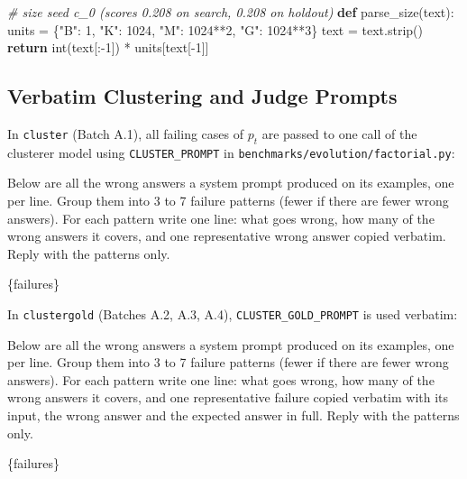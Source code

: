 \documentclass[10pt]{article}
\newenvironment{Shaded}{}{}
\newcommand{\BuiltInTok}[1]{\textcolor[rgb]{0.00,0.50,0.00}{#1}}
\newcommand{\CommentTok}[1]{\textcolor[rgb]{0.38,0.63,0.69}{\textit{#1}}}
\newcommand{\ControlFlowTok}[1]{\textcolor[rgb]{0.00,0.44,0.13}{\textbf{#1}}}
\newcommand{\DecValTok}[1]{\textcolor[rgb]{0.25,0.63,0.44}{#1}}
\newcommand{\KeywordTok}[1]{\textcolor[rgb]{0.00,0.44,0.13}{\textbf{#1}}}
\newcommand{\NormalTok}[1]{#1}
\newcommand{\OperatorTok}[1]{\textcolor[rgb]{0.40,0.40,0.40}{#1}}
\newcommand{\StringTok}[1]{\textcolor[rgb]{0.25,0.44,0.63}{#1}}
\begin{document}
\begin{itemize}
\begin{itemize}
\begin{Shaded}
\begin{Highlighting}[]
\CommentTok{\# size seed c\_0 (scores 0.208 on search, 0.208 on holdout)}
\KeywordTok{def}\NormalTok{ parse\_size(text):}
\NormalTok{    units }\OperatorTok{=}\NormalTok{ \{}\StringTok{"B"}\NormalTok{: }\DecValTok{1}\NormalTok{, }\StringTok{"K"}\NormalTok{: }\DecValTok{1024}\NormalTok{, }\StringTok{"M"}\NormalTok{: }\DecValTok{1024}\OperatorTok{**}\DecValTok{2}\NormalTok{, }\StringTok{"G"}\NormalTok{: }\DecValTok{1024}\OperatorTok{**}\DecValTok{3}\NormalTok{\}}
\NormalTok{    text }\OperatorTok{=}\NormalTok{ text.strip()}
    \ControlFlowTok{return} \BuiltInTok{int}\NormalTok{(text[:}\OperatorTok{{-}}\DecValTok{1}\NormalTok{]) }\OperatorTok{*}\NormalTok{ units[text[}\OperatorTok{{-}}\DecValTok{1}\NormalTok{]]}
\end{Highlighting}
\end{Shaded}
  \end{itemize}
\end{itemize}

\hypertarget{verbatim-clustering-and-judge-prompts}{%
\subsection{Verbatim Clustering and Judge
Prompts}\label{verbatim-clustering-and-judge-prompts}}

In \texttt{cluster} (Batch A.1), all failing cases of \(p_t\) are passed
to one call of the clusterer model using \texttt{CLUSTER\_PROMPT} in
\texttt{benchmarks/evolution/factorial.py}:

\begin{Shaded}
\begin{Highlighting}[]
\NormalTok{Below are all the wrong answers a system prompt produced on its examples, one per}
\NormalTok{line. Group them into 3 to 7 failure patterns (fewer if there are fewer wrong}
\NormalTok{answers). For each pattern write one line: what goes wrong, how many of the wrong}
\NormalTok{answers it covers, and one representative wrong answer copied verbatim. Reply with}
\NormalTok{the patterns only.}

\NormalTok{\{failures\}}
\end{Highlighting}
\end{Shaded}

In \texttt{clustergold} (Batches A.2, A.3, A.4),
\texttt{CLUSTER\_GOLD\_PROMPT} is used verbatim:

\begin{Shaded}
\begin{Highlighting}[]
\NormalTok{Below are all the wrong answers a system prompt produced on its examples, one per}
\NormalTok{line. Group them into 3 to 7 failure patterns (fewer if there are fewer wrong}
\NormalTok{answers). For each pattern write one line: what goes wrong, how many of the wrong}
\NormalTok{answers it covers, and one representative failure copied verbatim with its input,}
\NormalTok{the wrong answer and the expected answer in full. Reply with the patterns only.}

\NormalTok{\{failures\}}
\end{Highlighting}
\end{Shaded}
\end{document}
